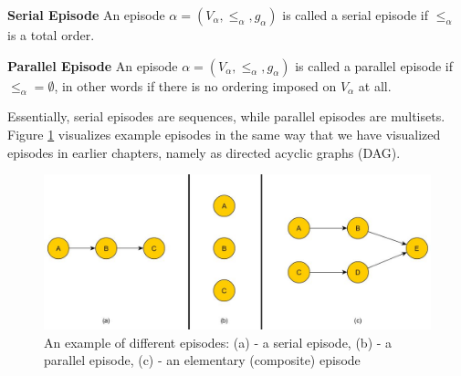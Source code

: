 \begin{mydef}
\textbf{Serial Episode} An episode $\alpha = (V_\alpha,{\leq}_{\alpha},g_\alpha)$ is called a serial episode if ${\leq}_{\alpha}$ is a total order. \cite{mannila1995discovering}
\end{mydef}

\begin{mydef}
\textbf{Parallel Episode} An episode $\alpha = (V_\alpha,{\leq}_{\alpha},g_\alpha)$ is called a parallel episode if ${\leq}_{\alpha} = \emptyset$, in other words if there is no ordering imposed on $V_\alpha$ at all. \cite{mannila1995discovering}
\end{mydef}

Essentially, serial episodes are sequences, while parallel episodes are multisets. Figure \ref{fig_exampleEpisodes} visualizes example episodes in the same way that we have visualized episodes in earlier chapters, namely as directed acyclic graphs (DAG).

\begin{figure}[h]
	\centering
  	\includegraphics[width=\textwidth]{exampleEpisodes}
	\caption{An example of different episodes: (a) - a serial episode, (b) - a parallel episode, (c) - an elementary (composite) episode}
	\label{fig_exampleEpisodes}
\end{figure}

%

